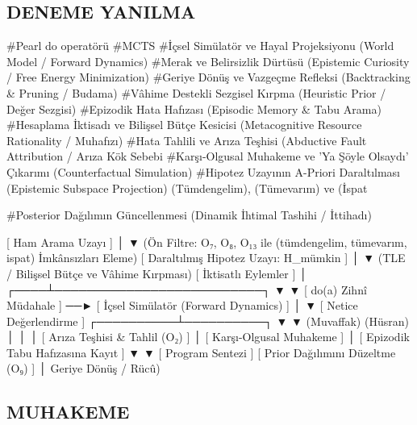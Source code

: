 \documentclass[11pt,a4paper]{article}
\begin{document}
\subsection{DENEME YANILMA}

#Pearl do operatörü
#MCTS
#İçsel Simülatör ve Hayal Projeksiyonu (World Model / Forward Dynamics) 
#Merak ve Belirsizlik Dürtüsü (Epistemic Curiosity / Free Energy Minimization)
#Geriye Dönüş ve Vazgeçme Refleksi (Backtracking & Pruning / Budama)
#Vâhime Destekli Sezgisel Kırpma (Heuristic Prior / Değer Sezgisi)
#Epizodik Hata Hafızası (Episodic Memory & Tabu Arama)
#Hesaplama İktisadı ve Bilişsel Bütçe Kesicisi (Metacognitive Resource Rationality /  Muhafızı)
#Hata Tahlili ve Arıza Teşhisi (Abductive Fault Attribution / Arıza Kök Sebebi
#Karşı-Olgusal Muhakeme ve 'Ya Şöyle Olsaydı' Çıkarımı (Counterfactual Simulation)
#Hipotez Uzayının A-Priori Daraltılması (Epistemic Subspace Projection)  (Tümdengelim),  (Tümevarım) ve  (İspat

#Posterior Dağılımın Güncellenmesi (Dinamik İhtimal Tashihi /  İttihadı)

[ Ham Arama Uzayı ]
        │
        ▼ (Ön Filtre: O₇, O₈, O₁₃ ile (tümdengelim, tümevarım, ispat) İmkânsızları Eleme)
[ Daraltılmış Hipotez Uzayı: H_mümkin ]
        │
        ▼ (TLE / Bilişsel Bütçe ve Vâhime Kırpması)
[ İktisatlı Eylemler ]
        │
   ┌────┴──────────────────────────┐
   ▼                               ▼
[ do(a) Zihnî Müdahale ] ──► [ İçsel Simülatör (Forward Dynamics) ]
                                   │
                                   ▼
                         [ Netice Değerlendirme ]
                        ┌──────────┴──────────┐
                        ▼                     ▼
                  (Muvaffak)              (Hüsran)
                        │                     │
                        │            [ Arıza Teşhisi & Tahlil (O₂) ]
                        │            [ Karşı-Olgusal Muhakeme ]
                        │            [ Epizodik Tabu Hafızasına Kayıt ]
                        ▼                     ▼
               [ Program Sentezi ]   [ Prior Dağılımını Düzeltme (O₉) ]
                                              │
                                     Geriye Dönüş / Rücû)







\subsection{MUHAKEME}
\end{document}
